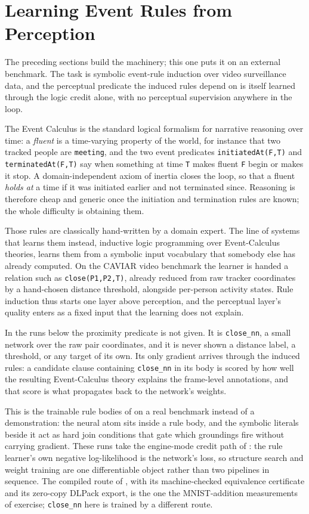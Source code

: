 \section{Learning Event Rules from Perception}\label{sec:ecinduction}

The preceding sections build the machinery; this one puts it on an external benchmark. The task is symbolic event-rule induction over video surveillance data, and the perceptual predicate the induced rules depend on is itself learned through the logic credit alone, with no perceptual supervision anywhere in the loop.

The Event Calculus is the standard logical formalism for narrative reasoning over time: a \emph{fluent} is a time-varying property of the world, for instance that two tracked people are \texttt{meeting}, and the two event predicates \texttt{initiatedAt(F,T)} and \texttt{terminatedAt(F,T)} say when something at time \texttt{T} makes fluent \texttt{F} begin or makes it stop. A domain-independent axiom of inertia closes the loop, so that a fluent \emph{holds at} a time if it was initiated earlier and not terminated since. Reasoning is therefore cheap and generic once the initiation and termination rules are known; the whole difficulty is obtaining them.

Those rules are classically hand-written by a domain expert. The line of systems that learns them instead, inductive logic programming over Event-Calculus theories, learns them from a symbolic input vocabulary that somebody else has already computed. On the CAVIAR video benchmark the learner is handed a relation such as \texttt{close(P1,P2,T)}, already reduced from raw tracker coordinates by a hand-chosen distance threshold, alongside per-person activity states. Rule induction thus starts one layer above perception, and the perceptual layer's quality enters as a fixed input that the learning does not explain.

In the runs below the proximity predicate is not given. It is \texttt{close\_nn}, a small network over the raw pair coordinates, and it is never shown a distance label, a threshold, or any target of its own. Its only gradient arrives through the induced rules: a candidate clause containing \texttt{close\_nn} in its body is scored by how well the resulting Event-Calculus theory explains the frame-level annotations, and that score is what propagates back to the network's weights.

This is the trainable rule bodies of  on a real benchmark instead of a demonstration: the neural atom sits inside a rule body, and the symbolic literals beside it act as hard join conditions that gate which groundings fire without carrying gradient. These runs take the engine-mode credit path of : the rule learner's own negative log-likelihood is the network's loss, so structure search and weight training are one differentiable object rather than two pipelines in sequence. The compiled route of , with its machine-checked equivalence certificate and its zero-copy DLPack export, is the one the MNIST-addition measurements of  exercise; \texttt{close\_nn} here is trained by a different route.

